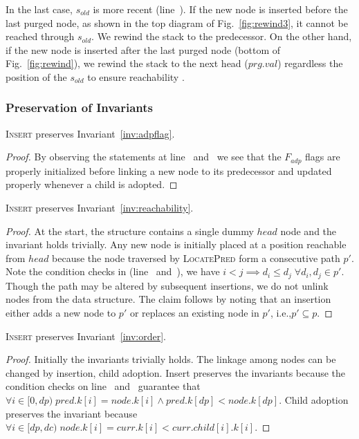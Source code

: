 \documentclass[10pt,journal,letter,compsoc]{IEEEtran}
\begin{document}
In the last case, $s_{old}$ is more recent (line~).
If the new node is inserted before the last purged node, as shown in the top diagram of Fig.~\ref{fig:rewind3}, it cannot be reached through $s_{old}$.
We rewind the stack to the predecessor.
On the other hand, if the new node is inserted after the last purged node (bottom of Fig.~\ref{fig:rewind}), we rewind the stack to the next head ($prg.val$) regardless the position of the $s_{old}$ to ensure reachability .

\subsubsection{Preservation of Invariants}
\textsc{Insert} preserves Invariant~\ref{inv:adpflag}.
\begin{proof}
    By observing the statements at line~ and~ we see that the $F_{adp}$ flags are properly initialized before linking a new node to its predecessor and updated properly whenever a child is adopted.
\end{proof}

\noindent\textsc{Insert} preserves Invariant~\ref{inv:reachability}.
\begin{proof}
    At the start, the structure contains a single dummy $head$ node and the invariant holds trivially. 
    Any new node is initially placed at a position reachable from $head$ because the node traversed by \textsc{LocatePred} form a consecutive path $p'$.
    Note the condition checks in (line~ and~), we have $i<j \implies d_i \leq d_j \;\forall d_i,d_j \in p'$.
    Though the path may be altered by subsequent insertions, we do not unlink nodes from the data structure.
    The claim follows by noting that an insertion either adds a new node to $p'$ or replaces an existing node in $p'$, i.e.,$p'\subseteq p$. 
\end{proof}

\noindent\textsc{Insert} preserves Invariant~\ref{inv:order}.
\begin{proof}
    Initially the invariants trivially holds.
    The linkage among nodes can be changed by insertion, child adoption.
    Insert preserves the invariants because the condition checks on line~ and~ guarantee that $\forall i \in [0, dp)\; pred.k[i] = node.k[i] \land pred.k[dp]<node.k[dp]$.
    Child adoption preserves the invariant because $\forall i \in [dp, dc)\; node.k[i] = curr.k[i] < curr.child[i].k[i]$.
\end{proof}
\end{document}
